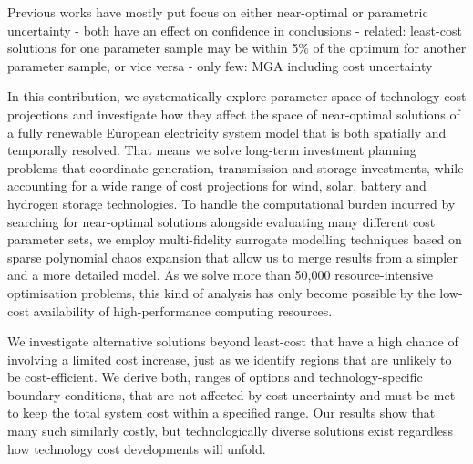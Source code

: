 
Previous works have mostly put focus on either near-optimal or parametric uncertainty
- both have an effect on confidence in conclusions
- related: least-cost solutions for one parameter sample may be within 5\% of the optimum for another parameter sample, or vice versa
- only few: MGA including cost uncertainty \cite{Trutnevyte2013,Li2017,lombardi_policy_2020}


In this contribution, we systematically explore parameter space of technology cost projections and
investigate how they affect the space of near-optimal solutions
of a fully renewable European electricity system model
that is both spatially and temporally resolved. %
That means we solve long-term investment planning problems that
coordinate generation, transmission and storage investments,
while accounting for a wide range of cost projections for wind, solar, battery and
hydrogen storage technologies.
To handle the computational burden incurred by searching for near-optimal solutions
alongside evaluating many different cost parameter sets,
we employ multi-fidelity surrogate modelling techniques based on sparse polynomial chaos expansion
that allow us to merge results from a simpler and a more detailed model.
As we solve more than 50,000 resource-intensive optimisation problems,
this kind of analysis has only become possible by the low-cost availability 
of high-performance computing resources. 



We investigate alternative solutions beyond least-cost
that have a high chance of involving a limited cost increase,
just as we identify regions that are unlikely to be cost-efficient.
We derive both, ranges of options and technology-specific boundary conditions,
that are not affected by cost uncertainty and must be 
met to keep the total system cost within a specified range.
Our results show that many such similarly costly,
but technologically diverse solutions exist regardless
how technology cost developments will unfold.

